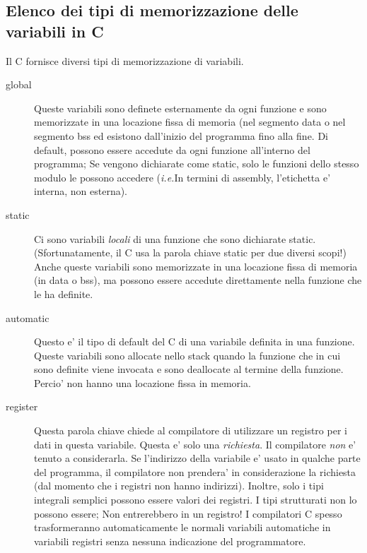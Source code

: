 \subsection{Elenco dei tipi di memorizzazione delle variabili in C}

Il C fornisce diversi tipi di memorizzazione di variabili.

\begin{description}
\item[global] 
Queste variabili sono definete esternamente da ogni funzione e sono
memorizzate in una locazione fissa di memoria (nel segmento {\code data}
o nel segmento {\code bss} ed esistono dall'inizio del programma fino
alla fine. Di default, possono essere accedute da ogni funzione 
all'interno del programma; Se vengono dichiarate come {\code static}, solo
le funzioni dello stesso modulo le possono accedere (\emph{i.e.}In termini
di assembly, l'etichetta e' interna, non esterna). 

\item[static] 
Ci sono variabili \emph{locali} di una funzione che sono dichiarate
{\code static}. (Sfortunatamente, il C usa la parola chiave {\code
static} per due diversi scopi!) Anche queste variabili sono 
memorizzate in una locazione fissa di memoria (in {\code data} o {\code bss}),
ma possono essere accedute direttamente nella funzione che le ha
definite. 

\item[automatic] 
Questo e' il tipo di default del C di una variabile definita
in una funzione. Queste variabili sono allocate nello stack quando
la funzione che in cui sono definite viene invocata e sono deallocate
al termine della funzione. Percio' non hanno una locazione fissa
in memoria.

\item[register] 
Questa parola chiave chiede al compilatore di utilizzare un registro
per i dati in questa variabile. Questa e' solo una \emph{richiesta}.
Il compilatore \emph{non} e' tenuto a considerarla. Se l'indirizzo
della variabile e' usato in qualche parte del programma, il compilatore
non prendera' in considerazione la richiesta (dal momento che i registri
non hanno indirizzi). Inoltre, solo i tipi integrali semplici possono
essere valori dei registri. I tipi strutturati non lo possono essere;
Non entrerebbero in un registro! I compilatori C spesso trasformeranno 
automaticamente le normali variabili automatiche in variabili registri
senza nessuna indicazione del programmatore. 


\end{description}
